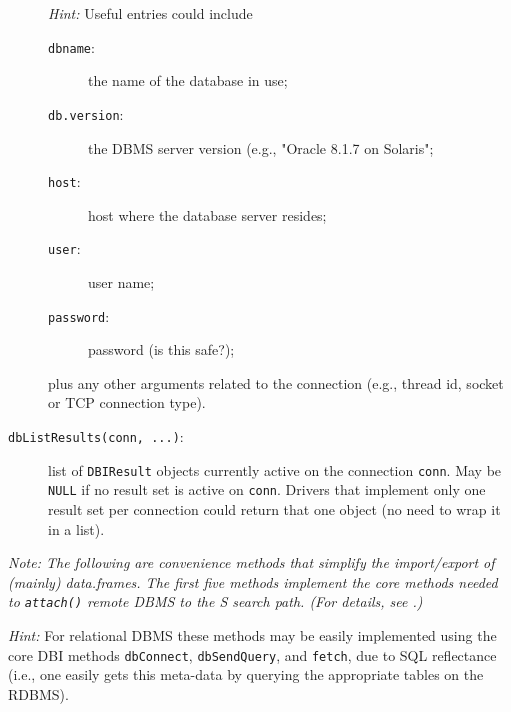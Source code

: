 \documentclass[graphics,times,psfig,dvips,hyper]{article}
\newcommand{\sfun}[1]{\mbox{\tt #1()}}  %
\newcommand{\sobj}[1]{\mbox{\tt #1}}    %
\newcommand{\smethod}[1]{\mbox{\tt #1}} %
\begin{document}
\begin{description}
  \emph{Hint:} Useful entries could include 
  \begin{description} 
  \item[\sobj{dbname}:] the name of the database in use; 
  \item[\sobj{db.version}:] the DBMS server version (e.g., 
  "Oracle 8.1.7 on Solaris"; 
  \item[\sobj{host}:] host where the database server resides; 
  \item[\sobj{user}:] user name;
  \item[\sobj{password}:] password (is this safe?);
  \end{description}
  plus any other arguments related to the connection (e.g., thread id,
  socket or TCP connection type).

\item[\smethod{dbListResults(conn, ...)}:]
  list of \sobj{DBIResult} objects currently active on the connection
  \sobj{conn}.  May be \sobj{NULL} if no result set is active
  on \sobj{conn}.  Drivers that implement only one result set per
  connection could return that one object (no need to wrap it in
  a list).

\end{description}

\emph{Note: The following are convenience methods that simplify
  the import/export of (mainly) data.frames.  The first five
  methods implement the core methods needed to \sfun{attach}
  remote DBMS to the S search path. (For details, see
  \cite{data-management:1991,database-classes:1999}.)
}

\emph{Hint:} For relational DBMS these methods may be easily implemented 
  using the core DBI methods \smethod{dbConnect}, \smethod{dbSendQuery}, 
  and \smethod{fetch}, due to SQL reflectance (i.e., one easily gets
  this meta-data by querying the appropriate tables on the RDBMS).
\end{document}

